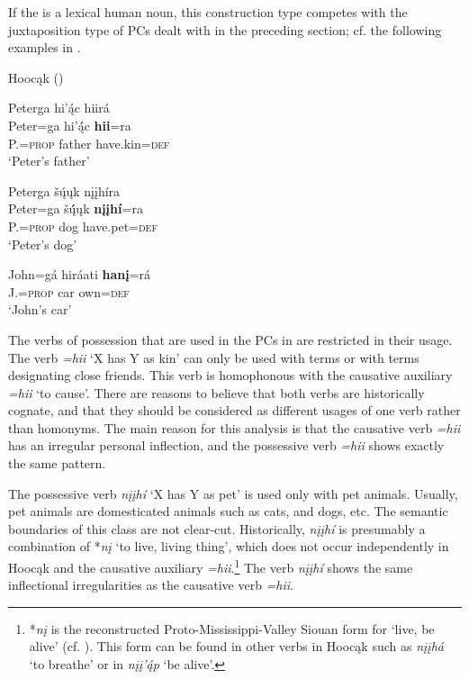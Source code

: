 \documentclass[output=paper]{LSP/langsci}
\begin{document}
If the  is a lexical human noun, this construction type competes with the juxtaposition type of PCs dealt with in the preceding section; cf. the following examples in .
 
\ea {}Hoocąk (\citealt[16]{Helmbrecht2003}) \label{petersthings}

\ea 
\glll Peterga hi'ą́c hiirá \\
Peter=ga        hi’ą́́c   \textbf{hii}=ra \\
P.=\textsc{prop}  father have.kin=\textsc{def} \\
\glt `Peter's father'

\ex 
\glll Peterga šų́ųk nįįhíra \\
Peter=ga      šų́́ųk   \textbf{nįįhí}=ra \\
P.=\textsc{prop} dog   have.pet=\textsc{def} \\
\glt `Peter's dog'

\ex \gll John=gá      hiráati \textbf{hanį}=rá \\
J.=\textsc{prop} car       own=\textsc{def} \\
\glt `John's car'

\z \z

The verbs of possession that are used in the PCs in  are restricted in their usage. The verb \textit{=hii} `X has Y as kin' can only be used with  terms or with terms designating close friends. This verb is homophonous with the causative auxiliary \textit{=hii} `to cause'. There are reasons to believe that both verbs are historically cognate, and that they should be considered as different usages of one verb rather than homonyms. The main reason for this analysis is that the causative verb \textit{=hii} has an irregular personal inflection, and the possessive verb \textit{=hii} shows exactly the same pattern. 
 
The possessive verb \textit{nįįh\'i} `X has Y as pet' is used only with pet animals. Usually, pet animals are domesticated animals such as cats, and dogs, etc. The semantic boundaries of this class are not clear-cut. Historically, \textit{nįįhí} is presumably a combination of *\textit{nį} `to live, living thing', which does not occur independently in Hoocąk and the causative auxiliary \textit{=hii}.\footnote{*\textit{n\k{i}} is the reconstructed Proto-Mississippi-Valley Siouan form for `live, be alive' (cf. \citealt{RankinEtAl2015AccessMay}). This form can be found in other verbs in Hoocąk such as \textit{n\k{i}\k{i}h\'a} `to breathe'  or in \textit{n\k{i}\k{i}'\'{\k{a}}p} `be alive'.} The verb \textit{nįįhí} shows the same inflectional irregularities as the causative verb \textit{=hii}. 
 
\end{document}

